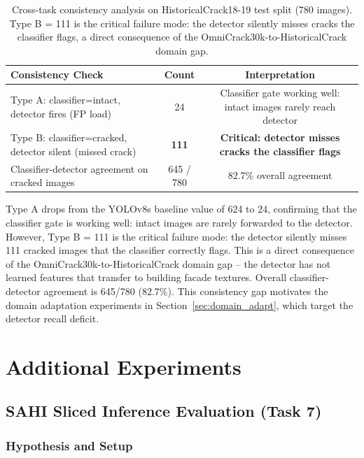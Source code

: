 \documentclass[12pt,a4paper]{article}
\begin{document}
\begin{table}[H]
\centering
\caption{Cross-task consistency analysis on HistoricalCrack18-19 test split (780 images). Type B = 111 is the critical failure mode: the detector silently misses cracks the classifier flags, a direct consequence of the OmniCrack30k-to-HistoricalCrack domain gap.}
\label{tab:cross_task}
\begin{tabular}{lcc}
\toprule
\rowcolor{white}
\textbf{Consistency Check} & \textbf{Count} & \textbf{Interpretation} \\
\midrule
Type A: classifier=intact, detector fires (FP load) & 24 & Classifier gate working well: intact images rarely reach detector \\
Type B: classifier=cracked, detector silent (missed crack) & \textbf{111} & \textbf{Critical: detector misses cracks the classifier flags} \\
Classifier-detector agreement on cracked images & 645 / 780 & 82.7\% overall agreement \\
\bottomrule
\end{tabular}
\end{table}

Type A drops from the YOLOv8s baseline value of 624 to 24, confirming that the classifier gate is working well: intact images are rarely forwarded to the detector. However, Type B = 111 is the critical failure mode: the detector silently misses 111 cracked images that the classifier correctly flags. This is a direct consequence of the OmniCrack30k-to-HistoricalCrack domain gap -- the detector has not learned features that transfer to building facade textures. Overall classifier-detector agreement is 645/780 (82.7\%). This consistency gap motivates the domain adaptation experiments in Section~\ref{sec:domain_adapt}, which target the detector recall deficit.

\clearpage
\section{Additional Experiments}

\subsection{SAHI Sliced Inference Evaluation (Task 7)}

\subsubsection{Hypothesis and Setup}
\end{document}
